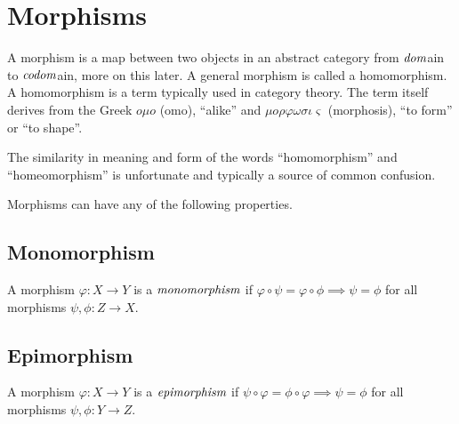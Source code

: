 \section{Morphisms} %
\label{sec:morphisms}
A morphism is a map between two objects in an abstract category from $\emph{dom}$ain to $\emph{codom}$ain, more on this later.
A general morphism is called a homomorphism. A homomorphism is a term typically used in category theory.
The term itself derives from the Greek $o \mu o$ (omo), ``alike'' and $\mu o \rho\varphi\omega\sigma\iota\varsigma$
(morphosis), ``to form'' or ``to shape''.
\begin{rem}
 The similarity in meaning and form of the words ``homomorphism'' and ``homeomorphism'' is unfortunate and typically
 a source of common confusion.
\end{rem}

Morphisms can have any of the following properties.

\subsection{Monomorphism} %
\label{subsec:monomorphism}
\begin{defn}[Monomorphism]
 A morphism $\varphi: X \to Y$ is a $\emph{monomorphism}$ if $\varphi \circ \psi = \varphi \circ \phi \implies \psi = \phi$ for all morphisms $\psi,\phi: Z \to X$.
 \\
 \end{defn}

\subsection{Epimorphism} %
\label{subsec:epimorphism}
\begin{defn}[Epimorphism]
 A morphism $\varphi: X \to Y$ is a $\emph{epimorphism}$ if $\psi \circ \varphi = \phi \circ \varphi \implies \psi = \phi$ for all morphisms $\psi,\phi: Y \to Z$.
 \\
\end{defn}
 
